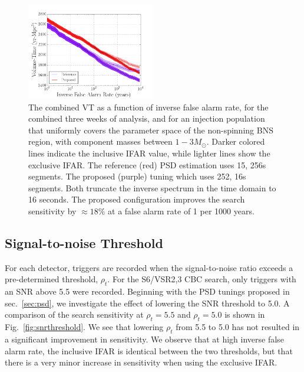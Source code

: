 
\begin{figure}
\includegraphics[width=0.5\textwidth]{papers/bns_o1_dev/figures/psd_combined.png}
\caption{\label{fig:psd} 
The combined VT as a function of inverse false alarm rate, for the combined three weeks of analysis, and for an injection population that uniformly covers the parameter space of the non-spinning BNS region, with component masses between $1- 3M_\odot$. Darker colored lines indicate the inclusive IFAR value, while lighter lines show the exclusive IFAR. The reference (red) PSD estimation uses 15, 256s segments. The proposed (purple) tuning which uses 252, 16s segments. Both truncate the inverse spectrum in the time domain to 16 seconds. The proposed configuration improves the search sensitivity by $\approx 18\% $ at a false alarm rate of 1 per 1000 years.
}
\end{figure}

\subsection{Signal-to-noise Threshold}
\label{sec:snr}

For each detector, triggers are recorded when the signal-to-noise ratio exceeds a pre-determined threshold, $\rho_t$. For the S6/VSR2,3 CBC search, only triggers with an SNR above 5.5 were recorded. Beginning with the PSD tunings proposed in sec.~\ref{sec:psd}, we investigate the effect of lowering the SNR threshold to 5.0. A comparison of the search sensitivity at $\rho_t=5.5$ and $\rho_t=5.0$ is shown in Fig.~\ref{fig:snrthreshold}. We see that lowering $\rho_t$ from 5.5 to 5.0 has not resulted in a significant improvement in sensitivity. We observe that at high inverse false alarm rate, the inclusive IFAR is identical between the two thresholds, but that there is a very minor increase in sensitivity when using the exclusive IFAR.

